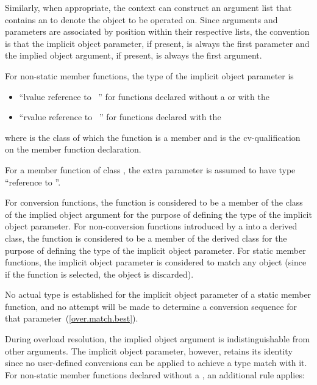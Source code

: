 \pnum
Similarly, when appropriate, the context can construct an
argument list that contains an
to denote
the object to be operated on.
Since arguments and parameters are
associated by position within their respective lists, the
convention is that the implicit object parameter, if present, is
always the first parameter and the implied object argument, if
present, is always the first argument.

\pnum
For non-static member functions, the type of the implicit object
parameter is

\begin{itemize}
\item ``lvalue reference to \cv{}~'' for functions declared
without a  or with the
\tcode{\&} 
\item ``rvalue reference to \cv{}~'' for functions declared with the
\tcode{\&\&} 
\end{itemize}

where
is the class of which the function is a member and
\cv{}
is the cv-qualification on the
member function declaration.
\begin{example}
For a
member
function of class
,
the extra parameter is assumed to have type
``reference to
''.
\end{example}
For conversion functions, the function is considered to be a member of the
class of the implied object argument for the purpose of defining the
type of the implicit object parameter.
For non-conversion functions
introduced by a
into a derived class, the function is
considered to be a member of the derived class for the purpose of defining
the type of the implicit object parameter.
For static member functions, the implicit object parameter is considered
to match any object (since if the function is selected, the object is
discarded).
\begin{note}
No actual type is established for the implicit object parameter
of a static member function, and no attempt will be made to determine a
conversion sequence for that parameter~(\ref{over.match.best}).
\end{note}

\pnum
{}%
During overload resolution, the implied object argument is
indistinguishable from other arguments.
The implicit object
parameter, however, retains its identity since
no user-defined conversions can be applied to achieve a type
match with it.
%
For non-static member functions declared without a ,
an additional rule applies:

